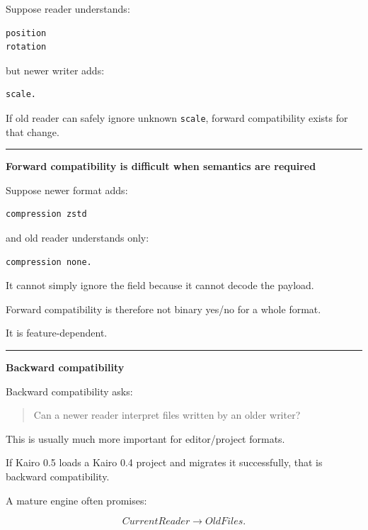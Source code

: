Suppose reader understands:

\begin{verbatim}
position
rotation
\end{verbatim}

but newer writer adds:

\begin{verbatim}
scale.
\end{verbatim}

If old reader can safely ignore unknown \texttt{scale}, forward compatibility exists for that change.

\begin{center}\rule{0.5\linewidth}{0.5pt}\end{center}

\textbf{Forward compatibility is difficult when semantics are required}

Suppose newer format adds:

\begin{verbatim}
compression zstd
\end{verbatim}

and old reader understands only:

\begin{verbatim}
compression none.
\end{verbatim}

It cannot simply ignore the field because it cannot decode the payload.

Forward compatibility is therefore not binary yes/no for a whole format.

It is feature-dependent.

\begin{center}\rule{0.5\linewidth}{0.5pt}\end{center}

\textbf{Backward compatibility}

Backward compatibility asks:

\begin{quote}
Can a newer reader interpret files written by an older writer?
\end{quote}

This is usually much more important for editor/project formats.

If Kairo 0.5 loads a Kairo 0.4 project and migrates it successfully, that is backward compatibility.

A mature engine often promises:

\[
CurrentReader
\rightarrow
OldFiles.
\]

